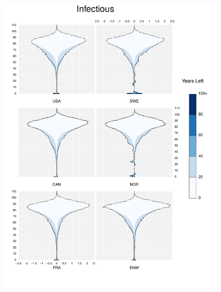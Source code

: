 \documentclass{article}
\begin{document}
\begin{appendices}
\begin{figure}
\includegraphics[scale=.8]{Figures/Causes/DxyInfectious.pdf}
\end{figure}
\begin{figure}
\centering

\end{figure}
\end{appendices}
\end{document}
